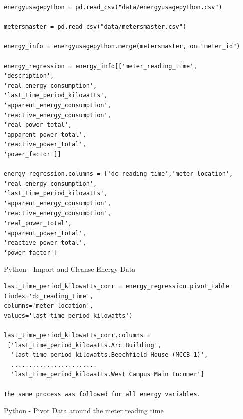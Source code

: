 \documentclass[12pt]{scrartcl}
\begin{document}
\begin{listing}[H]
\begin{verbatim}
energyusagepython = pd.read_csv("data/energyusagepython.csv")

metersmaster = pd.read_csv("data/metersmaster.csv")

energy_info = energyusagepython.merge(metersmaster, on="meter_id")

energy_regression = energy_info[['meter_reading_time',
'description',
'real_energy_consumption',
'last_time_period_kilowatts',
'apparent_energy_consumption',
'reactive_energy_consumption',
'real_power_total',
'apparent_power_total',
'reactive_power_total',
'power_factor']]

energy_regression.columns = ['dc_reading_time','meter_location',
'real_energy_consumption',
'last_time_period_kilowatts',
'apparent_energy_consumption',
'reactive_energy_consumption',
'real_power_total',
'apparent_power_total',
'reactive_power_total',
'power_factor']

\end{verbatim}
\caption{Python - Import and Cleanse Energy Data}
\label{list:[Python - Import and Cleanse Energy Data]}
\end{listing}

\begin{listing}[H]
\begin{verbatim}
last_time_period_kilowatts_corr = energy_regression.pivot_table
(index='dc_reading_time',
columns='meter_location',
values='last_time_period_kilowatts')

last_time_period_kilowatts_corr.columns =
 ['last_time_period_kilowatts.Arc Building',
  'last_time_period_kilowatts.Beechfield House (MCCB 1)',
  ........................
  'last_time_period_kilowatts.West Campus Main Incomer']
    
The same process was followed for all energy variables.

\end{verbatim}
\caption{Python - Pivot Data around the meter reading time}
\label{list:[Python - Pivot Data around the meter reading time]}
\end{listing}
\end{document}
